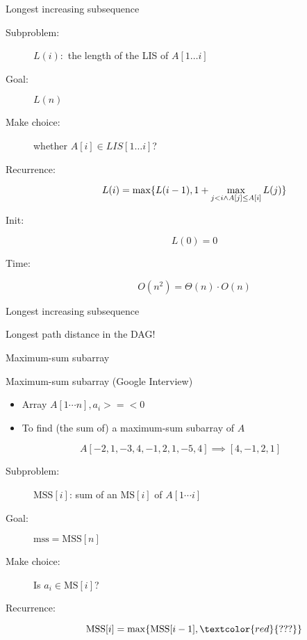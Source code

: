 \begin{frame}{Longest increasing subsequence}
  \begin{description}
	\item[Subproblem:] $L(i):$ the length of the LIS of $A[1 \ldots i]$
	\item[Goal:] $L(n)$
	  \pause
	\item[Make choice:] whether $A[i] \in LIS[1 \ldots i]$?
	\item[Recurrence:] 
	  \[
		L(i) = \max \{L(i-1), 1 + \max_{j < i \land A[j] \le A[i]} L(j)\}
	  \]
	  \pause
	\item[Init:]
	  \[
		L(0) = 0
	  \]
	\item[Time:] 
	  \[
		O(n^2) = \Theta(n) \cdot O(n)
	  \]
  \end{description}
\end{frame}
\begin{frame}{Longest increasing subsequence}

  \centerline{Longest path distance in the DAG!}
\end{frame}
\begin{frame}{Maximum-sum subarray}
  \begin{exampleblock}{Maximum-sum subarray (Google Interview)}
    \begin{itemize}
      \item Array $A[1 \cdots n], a_{i} >=< 0$
      \item To find (the sum of) a maximum-sum subarray of $A$
    \end{itemize}
	
    \[
      A[-2,1 ,-3,4,-1,2,1,-5,4] \implies [4,-1,2,1]
    \]
  \end{exampleblock}

  \pause
  \begin{description}
	\item[Subproblem:] $\text{MSS}[i]$: sum of an $\text{MS}[i]$ of $A[1 \cdots i]$
	\item[Goal:] $\text{mss} = \text{MSS}[n]$
	\pause
	\item[Make choice:] Is $a_{i} \in \text{MS}[i]$?
	\item[Recurrence:]
	  \[ 
		\text{MSS}[i] = \max \set{\text{MSS}[i-1], \textcolor{red}{???}}
	  \]
  \end{description}
\end{frame}
